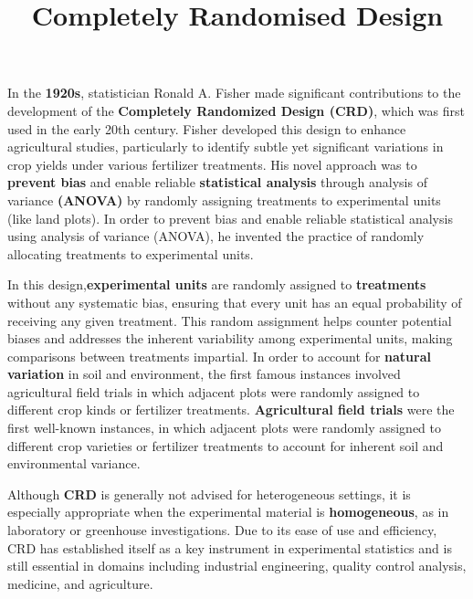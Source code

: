 \documentclass[
  letterpaper,
  DIV=11,
  numbers=noendperiod]{scrartcl}
\title{Completely Randomised Design}
\author{}
\date{}
\renewcommand*\contentsname{Table of contents}
\newcommand\contentsname{Table of contents}
\begin{document}
\maketitle
\ifdefined\Shaded\renewenvironment{Shaded}{\begin{tcolorbox}[interior hidden, sharp corners, boxrule=0pt, frame hidden, borderline west={3pt}{0pt}{shadecolor}, enhanced, breakable]}{\end{tcolorbox}}\fi

\renewcommand*\contentsname{Table of contents}
{
\hypersetup{linkcolor=}
\setcounter{tocdepth}{3}
\tableofcontents
}
In the \textbf{1920s}, statistician {Ronald A. Fisher} made significant
contributions to the development of the \textbf{Completely Randomized
Design (CRD)}, which was first used in the early 20th century. Fisher
developed this design to enhance agricultural studies, particularly to
identify subtle yet significant variations in crop yields under various
fertilizer treatments. His novel approach was to \textbf{prevent bias}
and enable reliable \textbf{statistical analysis} through analysis of
variance \textbf{(ANOVA)} by randomly assigning treatments to
experimental units (like land plots). In order to prevent bias and
enable reliable statistical analysis using analysis of variance (ANOVA),
he invented the practice of randomly allocating treatments to
experimental units.

In this design,\textbf{experimental units} are randomly assigned to
\textbf{treatments} without any systematic bias, ensuring that every
unit has an equal probability of receiving any given treatment. This
random assignment helps counter potential biases and addresses the
inherent variability among experimental units, making comparisons
between treatments impartial. In order to account for \textbf{natural
variation} in soil and environment, the first famous instances involved
agricultural field trials in which adjacent plots were randomly assigned
to different crop kinds or fertilizer treatments. \textbf{Agricultural
field trials} were the first well-known instances, in which adjacent
plots were randomly assigned to different crop varieties or fertilizer
treatments to account for inherent soil and environmental variance.

Although \textbf{CRD} is generally not advised for heterogeneous
settings, it is especially appropriate when the experimental material is
\textbf{homogeneous}, as in laboratory or greenhouse investigations. Due
to its ease of use and efficiency, CRD has established itself as a key
instrument in experimental statistics and is still essential in domains
including industrial engineering, quality control analysis, medicine,
and agriculture.
\end{document}
